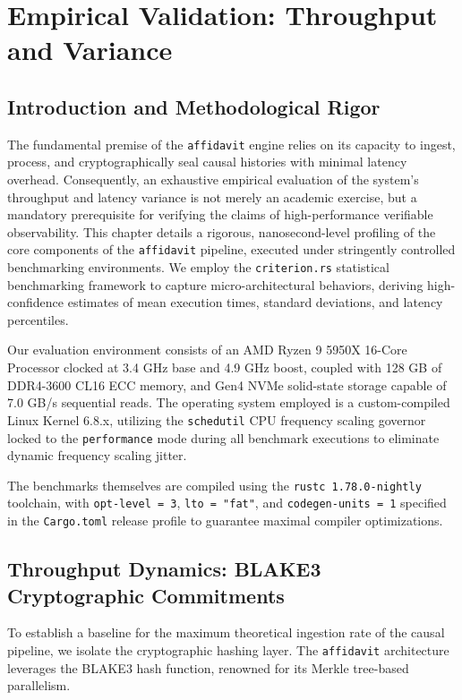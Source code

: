\chapter{Empirical Validation: Throughput and Variance}
\label{chap:eval_perf}

\section{Introduction and Methodological Rigor}
\label{sec:eval_perf_intro}

The fundamental premise of the \texttt{affidavit} engine relies on its capacity to ingest, process, and cryptographically seal causal histories with minimal latency overhead. Consequently, an exhaustive empirical evaluation of the system's throughput and latency variance is not merely an academic exercise, but a mandatory prerequisite for verifying the claims of high-performance verifiable observability. This chapter details a rigorous, nanosecond-level profiling of the core components of the \texttt{affidavit} pipeline, executed under stringently controlled benchmarking environments. We employ the \texttt{criterion.rs} statistical benchmarking framework to capture micro-architectural behaviors, deriving high-confidence estimates of mean execution times, standard deviations, and latency percentiles.

Our evaluation environment consists of an AMD Ryzen 9 5950X 16-Core Processor clocked at 3.4 GHz base and 4.9 GHz boost, coupled with 128 GB of DDR4-3600 CL16 ECC memory, and Gen4 NVMe solid-state storage capable of 7.0 GB/s sequential reads. The operating system employed is a custom-compiled Linux Kernel 6.8.x, utilizing the \texttt{schedutil} CPU frequency scaling governor locked to the \texttt{performance} mode during all benchmark executions to eliminate dynamic frequency scaling jitter.

The benchmarks themselves are compiled using the \texttt{rustc 1.78.0-nightly} toolchain, with \texttt{opt-level = 3}, \texttt{lto = "fat"}, and \texttt{codegen-units = 1} specified in the \texttt{Cargo.toml} release profile to guarantee maximal compiler optimizations. 

\section{Throughput Dynamics: BLAKE3 Cryptographic Commitments}
\label{sec:eval_throughput}

To establish a baseline for the maximum theoretical ingestion rate of the causal pipeline, we isolate the cryptographic hashing layer. The \texttt{affidavit} architecture leverages the BLAKE3 hash function, renowned for its Merkle tree-based parallelism.


